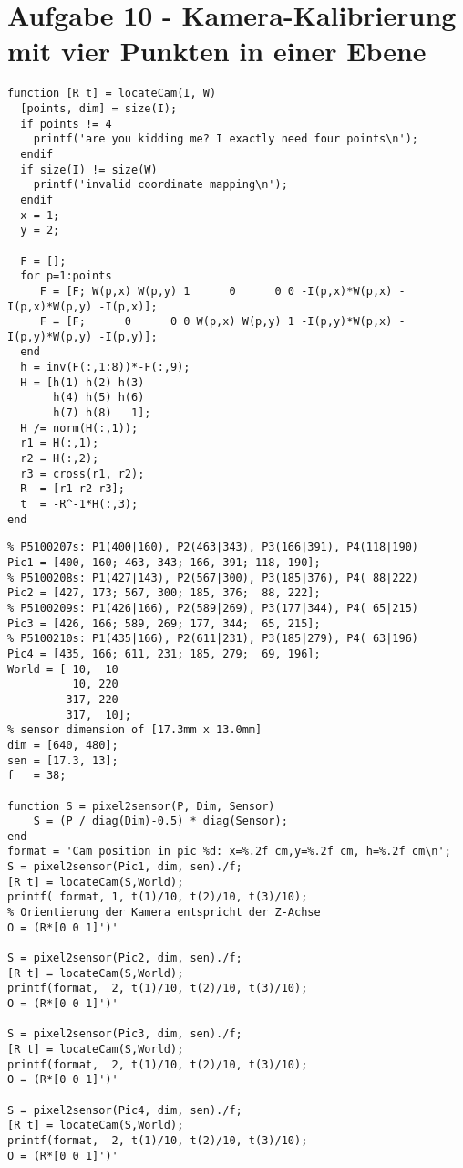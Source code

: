 




\newcommand{\nr}{5}


\section*{Aufgabe 10 - Kamera-Kalibrierung mit vier Punkten in einer Ebene}


\lstset{language=matlab}
\begin{lstlisting}[caption={Funktion f\"ur die Kamera-Kalibrierung}]
% returns calibration with rotation R and translation t
function [R t] = locateCam(I, W)
  [points, dim] = size(I);
  if points != 4
    printf('are you kidding me? I exactly need four points\n');
  endif
  if size(I) != size(W)
    printf('invalid coordinate mapping\n');
  endif
  x = 1;
  y = 2;

  F = [];
  for p=1:points
     F = [F; W(p,x) W(p,y) 1      0      0 0 -I(p,x)*W(p,x) -I(p,x)*W(p,y) -I(p,x)];
     F = [F;      0      0 0 W(p,x) W(p,y) 1 -I(p,y)*W(p,x) -I(p,y)*W(p,y) -I(p,y)];
  end
  h = inv(F(:,1:8))*-F(:,9);
  H = [h(1) h(2) h(3)
       h(4) h(5) h(6)
       h(7) h(8)   1];
  H /= norm(H(:,1));
  r1 = H(:,1);
  r2 = H(:,2);
  r3 = cross(r1, r2);
  R  = [r1 r2 r3];
  t  = -R^-1*H(:,3);
end
\end{lstlisting}

\begin{lstlisting}[caption={Anwendung der Kalibrierung}]
% Manuelle Bestimmung der Punkte
% P5100207s: P1(400|160), P2(463|343), P3(166|391), P4(118|190)
Pic1 = [400, 160; 463, 343; 166, 391; 118, 190];
% P5100208s: P1(427|143), P2(567|300), P3(185|376), P4( 88|222)
Pic2 = [427, 173; 567, 300; 185, 376;  88, 222];
% P5100209s: P1(426|166), P2(589|269), P3(177|344), P4( 65|215)
Pic3 = [426, 166; 589, 269; 177, 344;  65, 215];
% P5100210s: P1(435|166), P2(611|231), P3(185|279), P4( 63|196)
Pic4 = [435, 166; 611, 231; 185, 279;  69, 196];
World = [ 10,  10
          10, 220
         317, 220
         317,  10];
% sensor dimension of [17.3mm x 13.0mm]
dim = [640, 480];
sen = [17.3, 13];
f   = 38;

function S = pixel2sensor(P, Dim, Sensor)
    S = (P / diag(Dim)-0.5) * diag(Sensor);
end
format = 'Cam position in pic %d: x=%.2f cm,y=%.2f cm, h=%.2f cm\n'; 
S = pixel2sensor(Pic1, dim, sen)./f;
[R t] = locateCam(S,World);
printf( format, 1, t(1)/10, t(2)/10, t(3)/10);
% Orientierung der Kamera entspricht der Z-Achse
O = (R*[0 0 1]')'

S = pixel2sensor(Pic2, dim, sen)./f;
[R t] = locateCam(S,World);
printf(format,  2, t(1)/10, t(2)/10, t(3)/10);
O = (R*[0 0 1]')'

S = pixel2sensor(Pic3, dim, sen)./f;
[R t] = locateCam(S,World);
printf(format,  2, t(1)/10, t(2)/10, t(3)/10);
O = (R*[0 0 1]')'

S = pixel2sensor(Pic4, dim, sen)./f;
[R t] = locateCam(S,World);
printf(format,  2, t(1)/10, t(2)/10, t(3)/10);
O = (R*[0 0 1]')'
\end{lstlisting}


